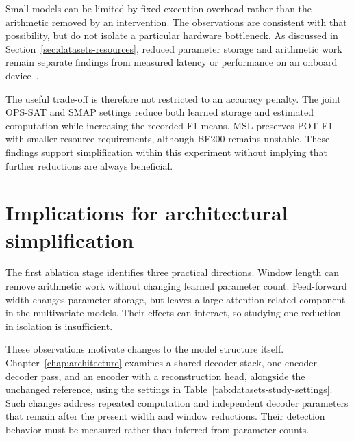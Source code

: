 Small models can be limited by fixed execution overhead rather than the
arithmetic removed by an intervention. The observations are consistent
with that possibility, but do not isolate a particular hardware
bottleneck. As discussed in Section~\ref{sec:datasets-resources}, reduced
parameter storage and arithmetic work remain separate findings from
measured latency or performance on an onboard device~\cite{Sze2017EfficientDNN}.

The useful trade-off is therefore not restricted to an accuracy penalty.
The joint \ac{OPS-SAT} and \ac{SMAP} settings reduce both learned storage
and estimated computation while increasing the recorded F1 means.
\ac{MSL} preserves \ac{POT} F1 with smaller resource requirements,
although BF200 remains unstable. These findings support simplification
within this experiment without implying that further reductions are
always beneficial.

\section{Implications for architectural simplification}
\label{sec:ablation-implications}
The first ablation stage identifies three practical directions. Window
length can remove arithmetic work without changing learned parameter
count. Feed-forward width changes parameter storage, but leaves a large
attention-related component in the multivariate models. Their effects
can interact, so studying one reduction in isolation is insufficient.

These observations motivate changes to the model structure itself.
Chapter~\ref{chap:architecture} examines a shared decoder stack, one
encoder--decoder pass, and an encoder with a reconstruction head, alongside
the unchanged reference, using the settings in
Table~\ref{tab:datasets-study-settings}. Such changes address repeated computation and
independent decoder parameters that remain after the present width and
window reductions. Their detection behavior must be measured rather than
inferred from parameter counts.

